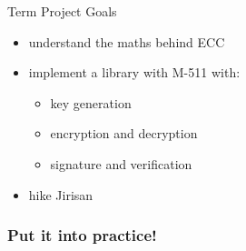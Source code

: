 \documentclass{beamer}
\begin{document}
\begin{frame}{Term Project Goals}
\begin{itemize}
	\pause
	\item understand the maths behind ECC
	\pause
	\item implement a library with M-511 with:
\begin{itemize}
	\item key generation
	\item encryption and decryption
	\item signature and verification
\end{itemize}
	\pause
	\item hike Jirisan
\end{itemize}
\end{frame} 

\begin{frame}
\frametitle{Put it into practice!}
\begin{figure}[htp] 
\end{figure}  
\end{frame}
\end{document}
